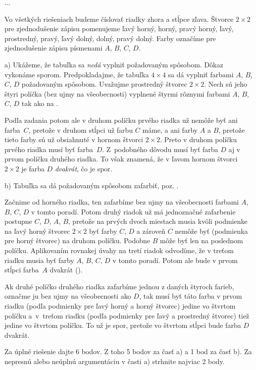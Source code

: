 {%
...}

{%
Vo všetkých riešeniach budeme číslovať riadky zhora a stĺpce zľava.
Štvorce $2\times 2$ pre zjednodušenie zápisu pomenujeme ľavý horný, horný, pravý horný, ľavý, prostredný, pravý, ľavý dolný, dolný, pravý dolný.
Farby označíme pre zjednodušenie zápisu písmenami $A$, $B$, $C$, $D$.

\smallskip
a)
Ukážeme, že tabuľka sa \emph{nedá} vyplniť požadovaným spôsobom. Dôkaz vykonáme sporom.
Predpokladajme, že tabuľka $4\times 4$ sa dá vyplniť farbami $A$, $B$, $C$, $D$ požadovaným spôsobom.
Uvažujme prostredný štvorec $2\times 2$.
Nech sú jeho štyri políčka (bez ujmy na všeobecnosti) vyplnené štyrmi rôznymi farbami $A$, $B$, $C$, $D$ tak ako na \obr.
%

Podľa zadania potom ale v druhom políčku prvého riadka už nemôže byť ani farba~$C$, pretože v druhom stĺpci už farbu $C$ máme,
a ani farby $A$ a $B$, pretože tieto farby sú už obsiahnuté v hornom štvorci $2\times 2$.
Preto v druhom políčku prvého riadka musí byť farba~$D$.
Z~podobného dôvodu musí byť farba $D$ aj v prvom políčku druhého riadka.
To však znamená, že v ľavom hornom štvorci $2\times 2$ je farba $D$ {\it dvakrát}, čo je spor.

\smallskip
b)
Tabuľka sa dá požadovaným spôsobom zafarbiť, poz. \obr.
%


Začnime od horného riadka, ten zafarbíme bez ujmy na všeobecnosti farbami $A$, $B$, $C$, $D$ v tomto poradí.
Potom druhý riadok už má jednoznačné zafarbenie postupne $C$, $D$, $A$, $B$, pretože na prvých dvoch miestach musia kvôli podmienke na ľavý horný štvorec $2 \times 2$ byť farby $C$, $D$ a zároveň $C$ nemôže byť (podmienka pre horný štvorec) na druhom políčku. Podobne $B$ môže byť len na poslednom políčku.
Aplikovaním rovnakej úvahy na tretí riadok odvodíme, že v treťom riadku musia byť farby $A$, $B$, $C$, $D$ v tomto poradí.
Potom ale bude v prvom stĺpci farba~$A$ dvakrát (\obr).
%

Ak druhé políčko druhého riadka zafarbíme jednou z daných štyroch farieb, označme ju bez ujmy na všeobecnosti ako $D$, tak musí byť táto farba v prvom riadku (podľa podmienky pre ľavý horný a horný štvorec) jedine vo štvrtom políčku a~v~treťom riadku (podľa podmienky pre ľavý a prostredný štvorec) tiež jedine vo štvrtom políčku. To už je spor, pretože vo štvrtom stĺpci bude farba $D$ dvakrát.

\schemaABC
Za úplné riešenie dajte 6 bodov. Z toho 5 bodov za časť a) a 1 bod za časť b).
Za nepresnú alebo neúplnú argumentáciu v časti a) strhnite najviac 2 body.
\endschema
}

